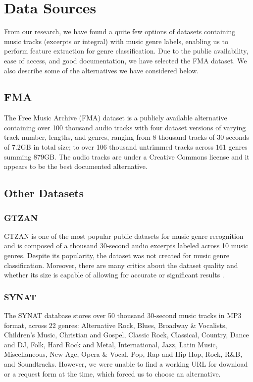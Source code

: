 \section{Data Sources}

From our research, we have found a quite few options of datasets containing music tracks (excerpts or integral) with music genre labels, enabling us to perform feature extraction for genre classification. Due to the public availability, ease of access, and good documentation, we have selected the FMA dataset. We also describe some of the alternatives we have considered below.

\subsection{FMA}

The Free Music Archive (FMA) dataset \cite{Defferrard2017} is a publicly available alternative containing over 100 thousand audio tracks with four dataset versions of varying track number, lengths, and genres, ranging from 8 thousand tracks of 30 seconds of 7.2GB in total size; to over 106 thousand untrimmed tracks across 161 genres summing 879GB. The audio tracks are under a Creative Commons license and it appears to be the best documented alternative.

\subsection{Other Datasets}

\subsubsection{GTZAN}

GTZAN is one of the most popular public datasets for music genre recognition \cite{Sturm2013} and is composed of a thousand 30-second audio excerpts labeled across 10 music genres. Despite its popularity, the dataset was not created for music genre classification. Moreover, there are many critics about the dataset quality and whether its size is capable of allowing for accurate or significant results \cite{Sturm2013}.

\subsubsection{SYNAT}

The SYNAT database \cite{10.1007/978-3-642-21916-0_75} stores over 50 thousand 30-second music tracks in MP3 format, across 22 genres: Alternative Rock, Blues, Broadway \& Vocalists, Children’s Music, Christian and Gospel, Classic Rock, Classical, Country, Dance and DJ, Folk, Hard Rock and Metal, International, Jazz, Latin Music, Miscellaneous, New Age, Opera \& Vocal, Pop, Rap and Hip-Hop, Rock, R\&B, and Soundtracks. However, we were unable to find a working URL for download or a request form at the time, which forced us to choose an alternative.

